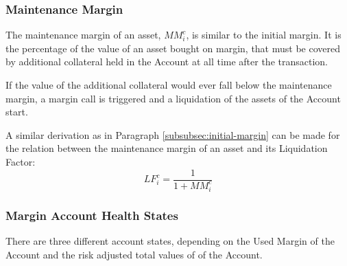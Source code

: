 \documentclass[sigconf,nonacm]{acmart}
\begin{document}
\subsubsection{Maintenance Margin}
The maintenance margin of an asset, $MM_{i}^{c}$, is similar to the initial margin.
It is the percentage of the value of an asset bought on margin, that must be covered by additional collateral held in the Account at all time after the transaction.

If the value of the additional collateral would ever fall below the maintenance margin, a margin call is triggered and a liquidation of the assets of the Account start.

A similar derivation as in Paragraph \ref{subsubsec:initial-margin} can be made for the relation between the maintenance margin of an asset and its Liquidation Factor:
\begin{equation}
    LF_{i}^{c} = \frac{1}{1 + MM_{i}^{c}}
\end{equation}

\subsubsection{Margin Account Health States}
\label{subsubsec:margin-account-health-states}
There are three different account states, depending on the Used Margin of the Account and the risk adjusted total values of of the Account.
\end{document}
